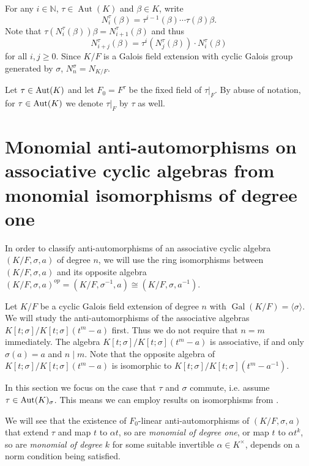 \documentclass{amsart}
\theoremstyle{plain}
\theoremstyle{definition}
\numberwithin{equation}{section}
\numberwithin{figure}{section}
\DeclareMathOperator{\Gal}{Gal}
\DeclareMathOperator{\Aut}{Aut}
\begin{document}
For any $i\in \mathbb{N}$, $\tau\in \Aut(K)$ and $\beta\in K$, write
$$
N_i^{\tau}(\beta) =  \tau^{i-1}(\beta) \cdots \tau(\beta) \beta.
$$
Note that $\tau(N_i^\tau(\beta)) \beta =N_{i+1}^\tau(\beta)$ and thus
\begin{equation}\label{E:Normrelation}
N_{i+j}^\tau(\beta)=  \tau^{i}(N_j^\tau(\beta))\cdot N_{i}^\tau(\beta)
\end{equation}
for all $i,j\geq 0$.  Since $K/F$ is a Galois field extension with cyclic Galois group generated by $\sigma$,  $N_{n}^\sigma=N_{K/F}$.

Let  $\tau \in {\rm Aut}(K)$ and let $F_0=F^\tau$ be the fixed field of $\tau|_F$.
 By abuse of notation, for $\tau \in {\rm Aut}(K)$ we denote $\tau|_F$ by $\tau$ as well.


\section{Monomial anti-automorphisms on associative cyclic algebras from monomial isomorphisms of degree one}

In order to classify anti-automorphisms of an associative cyclic algebra $(K/F,\sigma,a)$ of degree $n$, we will use the ring isomorphisms between
$(K/F,\sigma,a)$ and its opposite algebra $(K/F,\sigma,a)^{op}=(K/F,\sigma^{-1},a)\cong (K/F,\sigma,a^{-1})$.

 Let $K/F$ be a cyclic Galois field extension of degree $n$ with $\Gal (K/F)=\langle \sigma \rangle$. We will study the anti-automorphisms of the associative algebras $K[t;\sigma]/K[t;\sigma](t^m-a)$ first.  Thus we do not require that $n=m$ immediately. The algebra $K[t;\sigma]/K[t;\sigma](t^m-a)$ is  associative, if and only $\sigma(a)=a$ and $n \mid m$. Note that  the opposite algebra of $K[t;\sigma]/K[t;\sigma](t^m-a)$ is isomorphic to $K[t;\sigma]/K[t;\sigma](t^m-a^{-1})$.

 In this section we focus on the case that $\tau$ and $\sigma$ commute, i.e. assume $\tau \in {\rm Aut}(K)_\sigma$. This means we can employ results on isomorphisms from \cite{Pum2025}.

  We will see that the existence of $F_0$-linear anti-automorphisms of $(K/F,\sigma,a)$ that extend $\tau$ and map $t$ to $\alpha t$, so are \emph{monomial of degree one}, or map $t$ to $\alpha t^k$, so are \emph{monomial of degree $k$}  for some suitable invertible $\alpha\in K^\times$, depends on a norm condition being satisfied.
\end{document}
